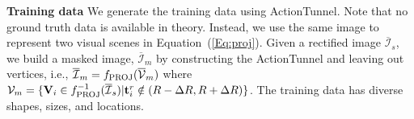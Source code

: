 \documentclass[10pt,twocolumn,letterpaper]{article}
\begin{document}





\noindent\textbf{Training data} 
We generate the training data using ActionTunnel. Note that no ground truth data is available in theory. Instead, we use the same image to represent two visual scenes in Equation~(\ref{Eq:proj}). Given a rectified image $\overline{\mathcal{I}}_s$, we build a masked image, $\overline{\mathcal{I}}_m$ by constructing the ActionTunnel and leaving out vertices, i.e., $\overline{\mathcal{I}}_m = f_{\rm PROJ}(\overline{\mathcal{V}}_{m})$ where $\mathcal{V}_{m} = \{\mathbf{V}_i \in f_{\rm PROJ}^{-1}(\overline{\mathcal{I}}_s)|\mathbf{t}_i^r \notin (R-\Delta R, R+\Delta R)\}$. The training data has diverse shapes, sizes, and locations. 
\end{document}

